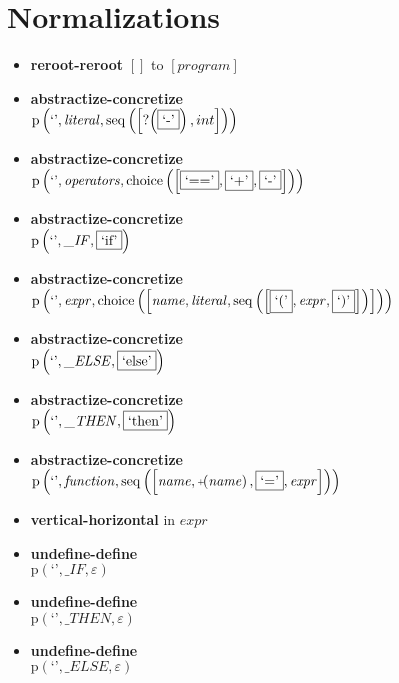 \section{Normalizations}
{\footnotesize\begin{itemize}
\item \textbf{reroot-reroot} $\left[\right]$ to $\left[\mathit{program}\right]$
\item \textbf{abstractize-concretize}\\$\mathrm{p}\left(\text{`'},\mathit{literal},\mathrm{seq}\left(\left[\mathord{?}\! \left(\fbox{$\text{`-'}$}\right), int\right]\right)\right)$
\item \textbf{abstractize-concretize}\\$\mathrm{p}\left(\text{`'},\mathit{operators},\mathrm{choice}\left(\left[\fbox{$\text{`=='}$}, \fbox{$\text{`+'}$}, \fbox{$\text{`-'}$}\right]\right)\right)$
\item \textbf{abstractize-concretize}\\$\mathrm{p}\left(\text{`'},\mathit{\_ IF},\fbox{$\text{`if'}$}\right)$
\item \textbf{abstractize-concretize}\\$\mathrm{p}\left(\text{`'},\mathit{expr},\mathrm{choice}\left(\left[\mathit{name}, \mathit{literal}, \mathrm{seq}\left(\left[\fbox{$\text{`('}$}, \mathit{expr}, \fbox{$\text{`)'}$}\right]\right)\right]\right)\right)$
\item \textbf{abstractize-concretize}\\$\mathrm{p}\left(\text{`'},\mathit{\_ ELSE},\fbox{$\text{`else'}$}\right)$
\item \textbf{abstractize-concretize}\\$\mathrm{p}\left(\text{`'},\mathit{\_ THEN},\fbox{$\text{`then'}$}\right)$
\item \textbf{abstractize-concretize}\\$\mathrm{p}\left(\text{`'},\mathit{function},\mathrm{seq}\left(\left[\mathit{name}, \plus \left(\mathit{name}\right), \fbox{$\text{`='}$}, \mathit{expr}\right]\right)\right)$
\item \textbf{vertical-horizontal}  in $\mathit{expr}$
\item \textbf{undefine-define}\\$\mathrm{p}\left(\text{`'},\mathit{\_ IF},\varepsilon\right)$
\item \textbf{undefine-define}\\$\mathrm{p}\left(\text{`'},\mathit{\_ THEN},\varepsilon\right)$
\item \textbf{undefine-define}\\$\mathrm{p}\left(\text{`'},\mathit{\_ ELSE},\varepsilon\right)$

\end{itemize}}
